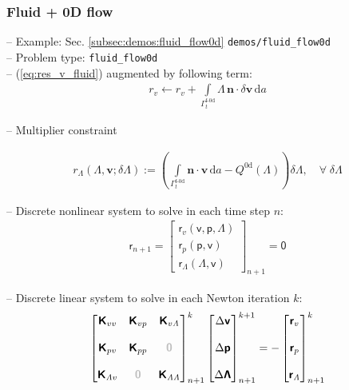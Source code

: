 \documentclass[a4paper,12pt]{report}
\newcommand{\fF}{\text{f}}
\newcommand{\bs}[1]{\boldsymbol{#1}}
\newcommand{\Gm}{\mathit{\Gamma}}
\newcommand{\zerom}{\textcolor{lightgray}{\bs{\mathsf{0}}}}
\newcommand{\ROP}{\bs{\mathsf{r}}}
\newcommand{\LMZ}{\bs{\mathsf{\Lambda}}}
\newcommand{\lmzi}{\mathit{\Lambda}} %
\begin{document}
\subsubsection{Fluid + 0D flow}\label{subsubsec:fluid_flow0d}

-- Example: Sec. \ref{subsec:demos:fluid_flow0d} \verb"demos/fluid_flow0d"\\

-- Problem type: \verb.fluid_flow0d.\\

-- (\ref{eq:res_v_fluid}) augmented by following term:
\begin{align}
r_v \leftarrow r_v + \int\limits_{\Gm_t^{\fF\text{-}\mathrm{0d}}}\!\mathit{\Lambda}\,\bs{n}\cdot\delta\bs{v}\,\mathrm{d}a
\end{align}

-- Multiplier constraint

\begin{align}
r_{\mathit{\Lambda}}(\mathit{\Lambda},\bs{v};\delta\mathit{\Lambda}):= \left(\int\limits_{\Gm_t^{\mathrm{\fF\text{-}0d}}}\! \bs{n}\cdot\bs{v}\,\mathrm{d}a - Q^{\mathrm{0d}}(\mathit{\Lambda})\right) \delta\mathit{\Lambda}, \quad \forall \; \delta\mathit{\Lambda}
\end{align}

-- Discrete nonlinear system to solve in each time step $n$:
\begin{align}
\ROP_{n+1} = \begin{bmatrix} \ROP_{v}(\bs{\mathsf{v}},\bs{\mathsf{p}},\LMZ) \\ \ROP_{p}(\bs{\mathsf{p}},\bs{\mathsf{v}}) \\ \ROP_{\mathit{\Lambda}}(\LMZ,\bs{\mathsf{v}}) \end{bmatrix}_{n+1} = \bs{\mathsf{0}}\label{eq:nonlin_sys_fluid_0d}
\end{align}

-- Discrete linear system to solve in each Newton iteration $k$:
\begin{align}
\begin{bmatrix} \bs{\mathsf{K}}_{vv} & \bs{\mathsf{K}}_{vp} & \bs{\mathsf{K}}_{v\lmzi} \\ \\ \bs{\mathsf{K}}_{pv} & \bs{\mathsf{K}}_{pp} & \zerom \\ \\  \bs{\mathsf{K}}_{\lmzi v} & \zerom & \bs{\mathsf{K}}_{\lmzi\lmzi}\end{bmatrix}_{n+1}^{k}\begin{bmatrix} \Delta\bs{\mathsf{v}} \\ \\ \Delta\bs{\mathsf{p}} \\ \\ \Delta\LMZ \end{bmatrix}_{n+1}^{k+1}=-\begin{bmatrix} \ROP_{v} \\ \\ \ROP_{p} \\ \\ \ROP_{\lmzi}\end{bmatrix}_{n+1}^{k} \label{eq:lin_sys_fluid_0d}
\end{align}
\end{document}
